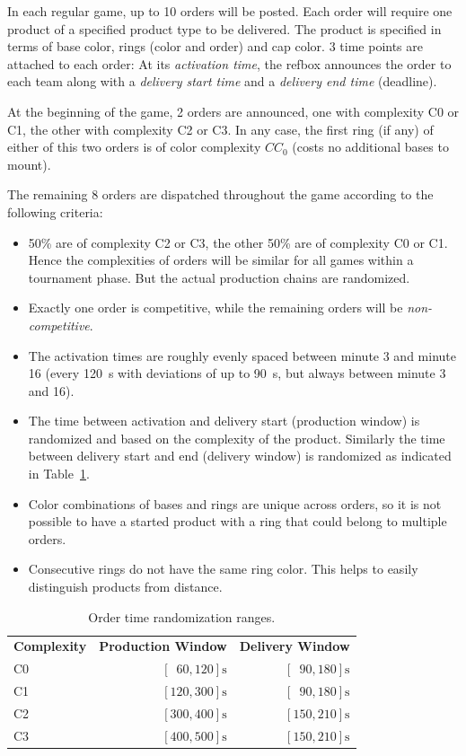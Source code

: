 \documentclass[12pt,twoside]{article}
\newcommand{\reftab}[1]{Table~\ref{#1}}
\begin{document}
In each regular game, up to 10 orders will be posted.
Each order will require one product of a specified product
type to be delivered.
The product is specified in terms of base
color, rings (color and order) and cap color.
3 time points are attached to each order:
At its \emph{activation time}, the \ac{refbox} announces the order to each
team along with a \emph{delivery start time} and a \emph{delivery end time}
(deadline).

At the beginning of the game, 2 orders are announced, one with complexity
C0 or C1, the other with complexity C2 or C3. In any case, the first ring
(if any) of either of this two orders is of color complexity $CC_0$
(costs no additional bases to mount).

The remaining 8 orders are dispatched throughout the game according to the
following criteria:
\begin{itemize}
  \item 50\% are of complexity C2 or C3, the other 50\% are of complexity C0 or
    C1.
    Hence the complexities of orders will be similar for all games within a
    tournament phase. But the actual production chains are randomized.
  \item Exactly one order is competitive, while the remaining orders will be
    \emph{non-competitive}.
  \item The activation times are roughly evenly spaced between minute 3 and
    minute 16 (every \SI{120}{\second} with deviations of up to
    \SI{90}{\second}, but always between minute 3 and 16).
  \item The time between activation and delivery start (production window) is
    randomized and based on the complexity of the product.
    Similarly the time between delivery start and end (delivery window)
    is randomized as indicated in \reftab{tab:order-time-randomization}.
  \item Color combinations of bases and rings are unique across orders, so it
    is not possible to have a started product with a ring that could belong to
    multiple orders.
  \item Consecutive rings do not have the same ring color. This helps to
    easily distinguish products from distance.
\end{itemize}
\begin{center}
\begin{table}
\begin{tabular}{l|r|r}
  \bf{Complexity} & \bf{Production Window} & \bf{Delivery Window} \\
  C0 & $[\phantom{1}60,120]\si{\second}$ & $[\phantom{1}90,180]\si{\second}$
  \\\hline
  C1 & $[120,300]\si{\second}$           & $[\phantom{1}90,180]\si{\second}$
  \\\hline
  C2 & $[300,400]\si{\second}$           & $[150,210]\si{\second}$\\\hline
  C3 & $[400,500]\si{\second}$           & $[150,210]\si{\second}$
\end{tabular}
\caption{Order time randomization ranges.}
\label{tab:order-time-randomization}
\end{table}
\end{center}
\end{document}
